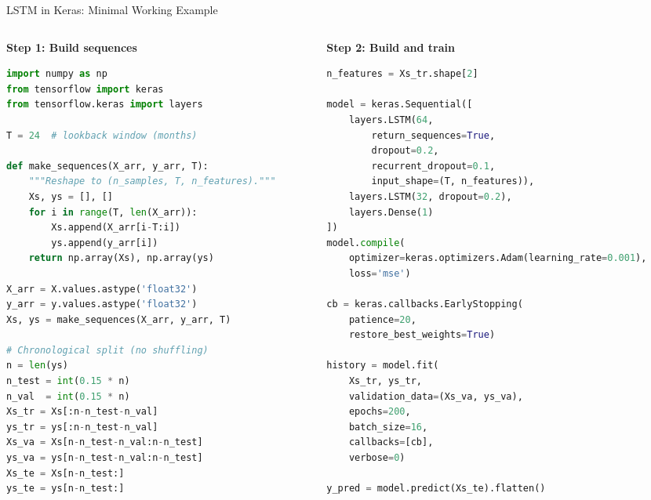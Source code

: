\documentclass[aspectratio=169, 10pt]{beamer}
\begin{document}
\begin{frame}[fragile]{LSTM in Keras: Minimal Working Example}
  \begin{columns}[T]
    \begin{column}{0.49\textwidth}
      \textbf{Step 1: Build sequences}
\begin{lstlisting}[language=Python, basicstyle=\tiny\ttfamily]
import numpy as np
from tensorflow import keras
from tensorflow.keras import layers

T = 24  # lookback window (months)

def make_sequences(X_arr, y_arr, T):
    """Reshape to (n_samples, T, n_features)."""
    Xs, ys = [], []
    for i in range(T, len(X_arr)):
        Xs.append(X_arr[i-T:i])
        ys.append(y_arr[i])
    return np.array(Xs), np.array(ys)

X_arr = X.values.astype('float32')
y_arr = y.values.astype('float32')
Xs, ys = make_sequences(X_arr, y_arr, T)

# Chronological split (no shuffling)
n = len(ys)
n_test = int(0.15 * n)
n_val  = int(0.15 * n)
Xs_tr = Xs[:n-n_test-n_val]
ys_tr = ys[:n-n_test-n_val]
Xs_va = Xs[n-n_test-n_val:n-n_test]
ys_va = ys[n-n_test-n_val:n-n_test]
Xs_te = Xs[n-n_test:]
ys_te = ys[n-n_test:]
\end{lstlisting}
    \end{column}
    \begin{column}{0.48\textwidth}
      \textbf{Step 2: Build and train}
\begin{lstlisting}[language=Python, basicstyle=\tiny\ttfamily]
n_features = Xs_tr.shape[2]

model = keras.Sequential([
    layers.LSTM(64,
        return_sequences=True,
        dropout=0.2,
        recurrent_dropout=0.1,
        input_shape=(T, n_features)),
    layers.LSTM(32, dropout=0.2),
    layers.Dense(1)
])
model.compile(
    optimizer=keras.optimizers.Adam(learning_rate=0.001),
    loss='mse')

cb = keras.callbacks.EarlyStopping(
    patience=20,
    restore_best_weights=True)

history = model.fit(
    Xs_tr, ys_tr,
    validation_data=(Xs_va, ys_va),
    epochs=200,
    batch_size=16,
    callbacks=[cb],
    verbose=0)

y_pred = model.predict(Xs_te).flatten()
\end{lstlisting}
    \end{column}
  \end{columns}
\end{frame}
\end{document}
